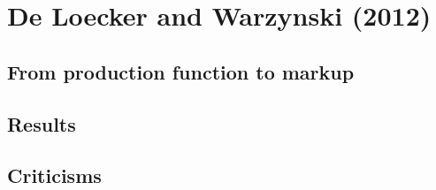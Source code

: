 \section{De Loecker and Warzynski (2012)}

\subsection{From production function to markup}



\subsection{Results}



\subsection{Criticisms}


